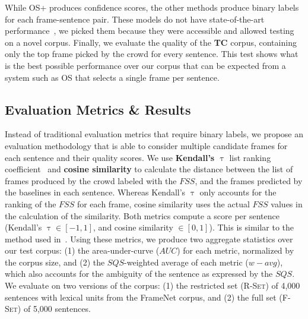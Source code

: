 While OS+ produces confidence scores, the other methods produce binary labels for each frame-sentence pair. These models do not have state-of-the-art performance~\cite{hermann2014semantic,fitzgerald2015semantic}, we picked them because they were accessible and allowed testing on a novel corpus. Finally, we evaluate the quality of the \textbf{TC} corpus, containing only the top frame picked by the crowd for every sentence. This test shows what is the best possible performance over our corpus that can be expected from a system such as OS that selects a single frame per sentence. %

\subsection{Evaluation Metrics \& Results}

Instead of traditional evaluation metrics that require binary labels, we propose an evaluation methodology that is able to consider multiple candidate frames for each sentence and their quality scores. We use \textbf{Kendall's $\uptau$} list ranking coefficient~\cite{kendall1938new} and \textbf{cosine similarity} to calculate the distance between the list of frames produced by the crowd labeled with the $FSS$, and the frames predicted by the baselines in each sentence. Whereas Kendall's $\uptau$ only accounts for the ranking of the $FSS$ for each frame, cosine similarity uses the actual $FSS$ values in the calculation of the similarity. Both metrics compute a score per sentence (Kendall's $\uptau \in [-1,1]$, and cosine similarity $\in [0,1]$). This is similar to the method used in~\cite{dumitrache2015b}.  Using these metrics, we produce two aggregate statistics over our test corpus: (1) the area-under-curve ($AUC$) for each metric, normalized by the corpus size, and (2) the $SQS$-weighted average of each metric ($w-avg$), which also accounts for the ambiguity of the sentence as expressed by the $SQS$. We evaluate on two versions of the corpus: (1) the restricted set (\textsc{R-Set}) of 4,000 sentences with lexical units from the FrameNet corpus, and (2) the full set (\textsc{F-Set}) of 5,000 sentences.

